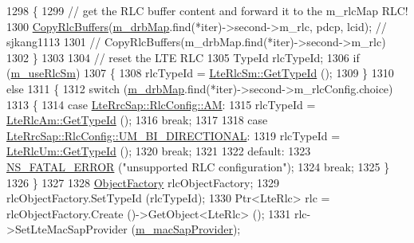 \begin{DoxyCode}
1298           \{
1299             \textcolor{comment}{// get the RLC buffer content and forward it to the m\_rlcMap RLC!}
1300             \hyperlink{classns3_1_1LteUeRrc_a16b7f4ca06cba845c7af6bb37670242e}{CopyRlcBuffers}(\hyperlink{classns3_1_1LteUeRrc_aa85c5bdde73c2072b2b3053e629bdce0}{m\_drbMap}.find(*iter)->second->m\_rlc, pdcp, lcid); \textcolor{comment}{//
      sjkang1113}
1301            \textcolor{comment}{// CopyRlcBuffers(m\_drbMap.find(*iter)->second->m\_rlc)}
1302           \} 
1303 
1304           \textcolor{comment}{// reset the LTE RLC}
1305           TypeId rlcTypeId;
1306           \textcolor{keywordflow}{if} (\hyperlink{classns3_1_1LteUeRrc_a724b0f4009ef95b569c52afb344fd5ae}{m\_useRlcSm})
1307             \{
1308               rlcTypeId = \hyperlink{classns3_1_1LteRlcSm_a160bd39ce4e0d113dd5d93cc3a258045}{LteRlcSm::GetTypeId} ();
1309             \}
1310           \textcolor{keywordflow}{else}
1311             \{
1312               \textcolor{keywordflow}{switch} (\hyperlink{classns3_1_1LteUeRrc_aa85c5bdde73c2072b2b3053e629bdce0}{m\_drbMap}.find(*iter)->second->m\_rlcConfig.choice)
1313                 \{
1314                 \textcolor{keywordflow}{case} \hyperlink{structns3_1_1LteRrcSap_1_1RlcConfig_ab6ab94ca4abaf717926f31db4dddc61baac722b7609a143367fc24a94f8e4f6c7}{LteRrcSap::RlcConfig::AM}: 
1315                   rlcTypeId = \hyperlink{classns3_1_1LteRlcAm_a28143176a465769583d9db0b4b36b91b}{LteRlcAm::GetTypeId} ();
1316                   \textcolor{keywordflow}{break};
1317           
1318                 \textcolor{keywordflow}{case} \hyperlink{structns3_1_1LteRrcSap_1_1RlcConfig_ab6ab94ca4abaf717926f31db4dddc61ba55368feac1627138969235809e6eedc5}{LteRrcSap::RlcConfig::UM\_BI\_DIRECTIONAL}: 
1319                   rlcTypeId = \hyperlink{classns3_1_1LteRlcUm_a119b2b1273c42483a050896d5232829d}{LteRlcUm::GetTypeId} ();
1320                   \textcolor{keywordflow}{break};
1321           
1322                 \textcolor{keywordflow}{default}:
1323                   \hyperlink{group__fatal_ga5131d5e3f75d7d4cbfd706ac456fdc85}{NS\_FATAL\_ERROR} (\textcolor{stringliteral}{"unsupported RLC configuration"});
1324                   \textcolor{keywordflow}{break};                
1325                 \}
1326             \}
1327   
1328           \hyperlink{classns3_1_1Object_a2810e70b8c8377aa8617138fc0f65e92}{ObjectFactory} rlcObjectFactory;
1329           rlcObjectFactory.SetTypeId (rlcTypeId);
1330           Ptr<LteRlc> rlc = rlcObjectFactory.Create ()->GetObject<LteRlc> ();
1331           rlc->SetLteMacSapProvider (\hyperlink{classns3_1_1LteUeRrc_a194a22ce682adab02b0e9d2fc71fda48}{m\_macSapProvider});

\end{DoxyCode}
